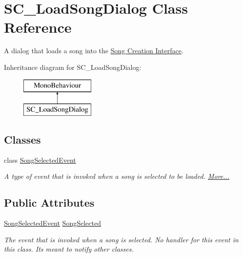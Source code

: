 \hypertarget{class_s_c___load_song_dialog}{}\section{S\+C\+\_\+\+Load\+Song\+Dialog Class Reference}
\label{class_s_c___load_song_dialog}


A dialog that loads a song into the \hyperlink{group___doc_s_c}{Song Creation Interface}.  


Inheritance diagram for S\+C\+\_\+\+Load\+Song\+Dialog\+:\begin{figure}[H]
\begin{center}
\leavevmode
\includegraphics[height=2.000000cm]{class_s_c___load_song_dialog}
\end{center}
\end{figure}
\subsection*{Classes}
\begin{DoxyCompactItemize}
\item 
class \hyperlink{group___s_c___l_s_d_event_types_class_s_c___load_song_dialog_1_1_song_selected_event}{Song\+Selected\+Event}
\begin{DoxyCompactList}\small\item\em A type of event that is invoked when a song is selected to be loaded.  \hyperlink{group___s_c___l_s_d_event_types_class_s_c___load_song_dialog_1_1_song_selected_event}{More...}\end{DoxyCompactList}\end{DoxyCompactItemize}
\subsection*{Public Attributes}
\begin{DoxyCompactItemize}
\item 
\hyperlink{group___s_c___l_s_d_event_types_class_s_c___load_song_dialog_1_1_song_selected_event}{Song\+Selected\+Event} \hyperlink{group___s_c___l_s_d_events_ga48d606b2c8291fee822dcc2b14ddcecc}{Song\+Selected}
\begin{DoxyCompactList}\small\item\em The event that is invoked when a song is selected. No handler for this event in this class. It\textquotesingle{}s meant to notify other classes. \end{DoxyCompactList}\end{DoxyCompactItemize}
